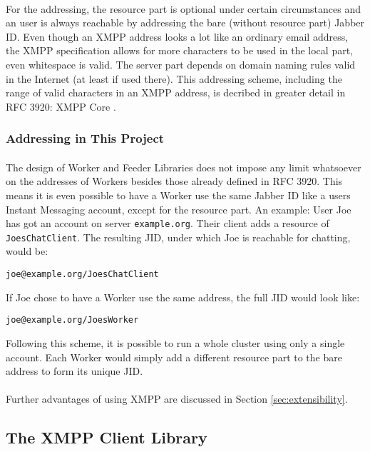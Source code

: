 \paragraph{}
For the addressing, the resource part is optional under certain circumstances and an user is always reachable by addressing the bare (without resource part) Jabber ID. Even though an XMPP address looks a lot like an ordinary email address, the XMPP specification allows for more characters to be used in the local part, even whitespace is valid. The server part depends on domain naming rules valid in the Internet (at least if used there). This addressing scheme, including the range of valid characters in an XMPP address, is decribed in greater detail in RFC 3920: XMPP Core \cite{xmpp-core}.

\subsubsection{Addressing in This Project}
\label{sec:addressing}
\paragraph{}
The design of Worker and Feeder Libraries does not impose any limit whatsoever on the addresses of Workers besides those already defined in RFC 3920. This means it is even possible to have a Worker use the same Jabber ID like a users Instant Messaging account, except for the resource part. An example: User Joe has got an account on server \texttt{example.org}. Their client adds a resource of \texttt{JoesChatClient}. The resulting JID, under which Joe is reachable for chatting, would be:
\begin{center}
\texttt{joe@example.org/JoesChatClient}
\end{center}
If Joe chose to have a Worker use the same address, the full JID would look like:
\begin{center}
\texttt{joe@example.org/JoesWorker}
\end{center}
Following this scheme, it is possible to run a whole cluster using only a single account. Each Worker would simply add a different resource part to the bare address to form its unique JID.
\paragraph{}
Further advantages of using XMPP are discussed in Section \ref{sec:extensibility}.

\subsection{The XMPP Client Library}
\label{sec:clientlib}
